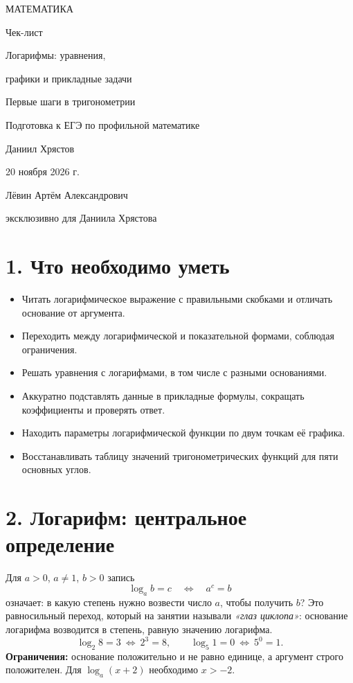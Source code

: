 \documentclass[a4paper,12pt]{article}
\newcommand{\key}[1]{\textcolor{darkaccent}{\textbf{#1}}}
\newcommand{\checkitem}[1]{\item[$\square$] #1}
\begin{document}
\thispagestyle{empty}
\begin{center}
\vspace*{23mm}
{\color{darkaccent}\Large МАТЕМАТИКА}\par
\vspace{19mm}
{\Huge Чек-лист}\par
\vspace{11mm}
{\color{accent}\LARGE Логарифмы: уравнения,\par графики и прикладные задачи}\par
\vspace{6mm}
{\color{accent}\Large Первые шаги в тригонометрии}\par
\vspace{18mm}
{\large Подготовка к ЕГЭ по профильной математике}\par
\vfill
{\large Даниил Хрястов}\par
\vspace{10mm}
{20 ноября 2026 г.}\par
\vspace{16mm}
{\small Лёвин Артём Александрович}\par
{\small эксклюзивно для Даниила Хрястова}\par
\vspace{14mm}
\end{center}
\clearpage
\section*{1. Что необходимо уметь}
\begin{itemize}[label=$\square$]
\checkitem{Читать логарифмическое выражение с правильными скобками и отличать основание от аргумента.}
\checkitem{Переходить между логарифмической и показательной формами, соблюдая ограничения.}
\checkitem{Решать уравнения с логарифмами, в том числе с разными основаниями.}
\checkitem{Аккуратно подставлять данные в прикладные формулы, сокращать коэффициенты и проверять ответ.}
\checkitem{Находить параметры логарифмической функции по двум точкам её графика.}
\checkitem{Восстанавливать таблицу значений тригонометрических функций для пяти основных углов.}
\end{itemize}
\section*{2. Логарифм: центральное определение}
Для $a>0$, $a\ne1$, $b>0$ запись
\[
\boxed{\log_a b=c\quad\Longleftrightarrow\quad a^c=b}
\]
означает: в какую степень нужно возвести число $a$, чтобы получить $b$? Это равносильный переход, который на занятии называли \emph{«глаз циклопа»}: основание логарифма возводится в степень, равную значению логарифма.
\[
\log_2 8=3\ \Longleftrightarrow\ 2^3=8,\qquad
\log_5 1=0\ \Longleftrightarrow\ 5^0=1.
\]
\key{Ограничения:} основание положительно и не равно единице, а аргумент строго положителен. Для $\log_a(x+2)$ необходимо $x>-2$.
\end{document}
